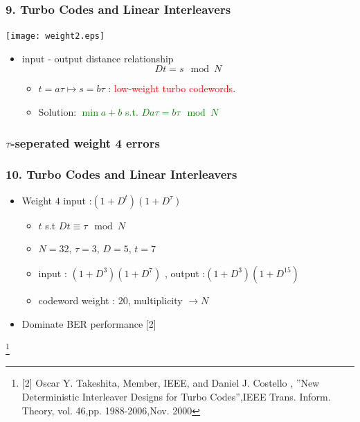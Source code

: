 \documentclass{beamer}  %
\newcommand\blfootnote[1]{%
  \begingroup
  \renewcommand\thefootnote{}\footnote{#1}%
  \addtocounter{footnote}{-1}%
  \endgroup
}
\begin{document}
\begin{frame}
\frametitle{9.  Turbo Codes and Linear Interleavers }

\begin{center}
\texttt{[image: weight2.eps]}
\end{center}

\begin{itemize}


\item input - output distance relationship
 \begin{equation} 
 Dt =s \mod N
 \label{cong}
 \end{equation}
\begin{itemize}
\item 
$t=a\tau
\mapsto s=b\tau$ :
 \textcolor{red}{low-weight turbo codewords}.

\item Solution: \textcolor{green}{$\min{ a+b}$ s.t. $Da\tau =b\tau \mod N$} 
\end{itemize}
\end{itemize}
\end{frame}


\subsubsection{$\tau$-seperated weight 4 errors }
\begin{frame}
\frametitle{10.  Turbo Codes and Linear Interleavers}
\begin{itemize}
\item Weight $4$ input :$ (1+D^t)(1+D^{\tau})$

\begin{itemize}
\item $t$ s.t $Dt \equiv \tau \mod N$
\end{itemize}
\begin{example}
\begin{itemize}
\item  $N=32,\, \tau=3, \, D=5,\, t=7$

\item input : $(1+D^3)(1+D^7)$  , output :$(1+ D^3)(1+D^{15})$

\item codeword weight : $20$, multiplicity $\rightarrow N$
\end{itemize}



\end{example}
\item Dominate BER performance [2]

\end{itemize}
\blfootnote {[2] Oscar Y. Takeshita, Member, IEEE, and Daniel J. Costello ,
''New Deterministic Interleaver Designs for Turbo Codes'',IEEE Trans. Inform. 
Theory, vol.  46,pp. 1988-2006,Nov. 2000}
\end{frame}
\end{document}
